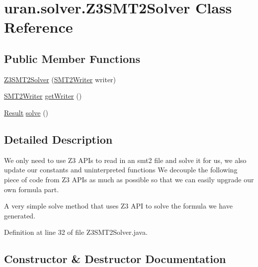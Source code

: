 \hypertarget{classuran_1_1solver_1_1_z3_s_m_t2_solver}{}\section{uran.\+solver.\+Z3\+S\+M\+T2\+Solver Class Reference}
\label{classuran_1_1solver_1_1_z3_s_m_t2_solver}
\subsection*{Public Member Functions}
\begin{DoxyCompactItemize}
\item 
\hyperlink{classuran_1_1solver_1_1_z3_s_m_t2_solver_a961b3005a57f8904e9037dc9fab7cf59}{Z3\+S\+M\+T2\+Solver} (\hyperlink{classuran_1_1formula_1_1smt2_1_1_s_m_t2_writer}{S\+M\+T2\+Writer} writer)
\item 
\hyperlink{classuran_1_1formula_1_1smt2_1_1_s_m_t2_writer}{S\+M\+T2\+Writer} \hyperlink{classuran_1_1solver_1_1_z3_s_m_t2_solver_ad09cc76d68a52efc3125db57a1a5f7fb}{get\+Writer} ()
\item 
\hyperlink{enumuran_1_1solver_1_1_result}{Result} \hyperlink{classuran_1_1solver_1_1_z3_s_m_t2_solver_a0830a60b458dd84b98d8ff01fd483712}{solve} ()
\end{DoxyCompactItemize}


\subsection{Detailed Description}
We only need to use Z3 A\+P\+Is to read in an smt2 file and solve it for us, we also update our constants and uninterpreted functions We decouple the following piece of code from Z3 A\+P\+Is as much as possible so that we can easily upgrade our own formula part.

A very simple solve method that uses Z3 A\+P\+I to solve the formula we have generated. 

Definition at line 32 of file Z3\+S\+M\+T2\+Solver.\+java.



\subsection{Constructor \& Destructor Documentation}
\hypertarget{classuran_1_1solver_1_1_z3_s_m_t2_solver_a961b3005a57f8904e9037dc9fab7cf59}{}
